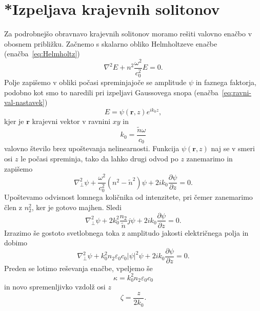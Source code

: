 \section{*Izpeljava krajevnih solitonov}
\label{chap:ks}
Za podrobnejšo obravnavo krajevnih solitonov moramo rešiti valovno 
enačbo v obosnem približku. Začnemo s skalarno obliko Helmholtzeve enačbe (enačba~\ref{eq:Helmholtz})
\begin{equation}
\nabla^{2}E+n^{2}\frac{\omega^{2}}{c_0^{2}}E=0.
\label{8.80}
\end{equation}
Polje zapišemo v obliki počasi spreminjajoče se amplitude $\psi$ in faznega faktorja, podobno kot 
smo to naredili pri izpeljavi Gaussovega snopa (enačba~\ref{eq:ravni-val-nastavek})
\begin{equation}
E=\psi(\mathbf{r},z)e^{ik_{0}z},
\label{8.81}
\end{equation}
 kjer je $\mathbf{r}$ krajevni vektor v ravnini $xy$ in 
\begin{equation}
k_{0}=\frac{\tilde{n}\omega}{c_0} 
\end{equation}
valovno število brez upoštevanja nelinearnosti.
Funkcija $\psi(\mathbf{r},z)$ naj se v smeri osi $z$ le počasi spreminja, tako da lahko
drugi odvod po $z$ zanemarimo in zapišemo 
\begin{equation}
\nabla_{\bot}^{2}\psi+\frac{\omega^{2}}{c_0^{2}}(n^{2}-\tilde{n}^{2})\psi+2ik_{0}
\frac{\partial\psi}{\partial z}=0.
\label{8.82}
\end{equation}
Upoštevamo odvisnost lomnega količnika od intenzitete, pri čemer
zanemarimo člen z $n_{2}^{2}$, ker je gotovo majhen. Sledi
\begin{equation}
\nabla_{\bot}^{2}\psi+2k_{0}^{2}\frac{n_{2}}{\tilde{n}}j\psi+2ik_{0}\frac{\partial\psi}{\partial z}=0.
\label{8.83}
\end{equation}
Izrazimo še gostoto svetlobnega toka z amplitudo jakosti električnega polja in dobimo
\begin{equation}
\nabla_{\bot}^{2}\psi+
k_{0}^{2} n_2 \varepsilon_0 c_0 |\psi|^2 \psi+
2ik_{0}\frac{\partial\psi}{\partial z}=0.
\label{8.83a}
\end{equation}
Preden se lotimo reševanja enačbe, vpeljemo še
\begin{equation}
\kappa=k_{0}^{2} n_2 \varepsilon_0 c_0
\end{equation}
 in novo spremenljivko vzdolž osi $z$
\begin{equation}
\zeta=\frac{z}{2k_{0}}.
\end{equation}

